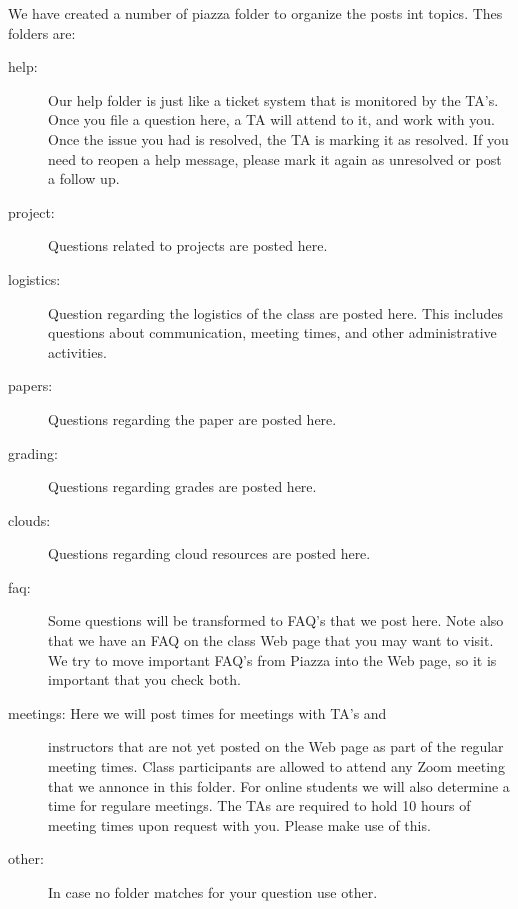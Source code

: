 We have created a number of piazza folder to organize the posts int
topics.  Thes folders are:
\begin{description}
\item[{help:}] \leavevmode
Our help folder is just like a ticket system that is monitored by
the TA's. Once you file a question here, a TA will attend to it,
and work with you. Once the issue you had is resolved, the TA is
marking it as resolved. If you need to reopen a help message,
please mark it again as unresolved or post a follow up.

\item[{project:}] \leavevmode
Questions related to projects are posted here.

\item[{logistics:}] \leavevmode
Question regarding the logistics of the class are posted
here. This includes questions about communication, meeting times,
and other administrative activities.

\item[{papers:}] \leavevmode
Questions regarding the paper are posted here.

\item[{grading:}] \leavevmode
Questions regarding grades are posted here.

\item[{clouds:}] \leavevmode
Questions regarding cloud resources are posted here.

\item[{faq:}] \leavevmode
Some questions will be transformed to FAQ's that we post here.
Note also that we have an FAQ on the class Web page that you may
want to visit. We try to move important FAQ's from Piazza into the
Web page, so it is important that you check both.

\item[{meetings: Here we will post times for meetings with TA's and}] \leavevmode
instructors that are not yet posted on the Web page as part of the
regular meeting times. Class participants are allowed to attend
any Zoom meeting that we annonce in this folder. For online
students we will also determine a time for regulare meetings. The
TAs are required to hold 10 hours of meeting times upon request
with you. Please make use of this.

\item[{other:}] \leavevmode
In case no folder matches for your question use other.

\end{description}

